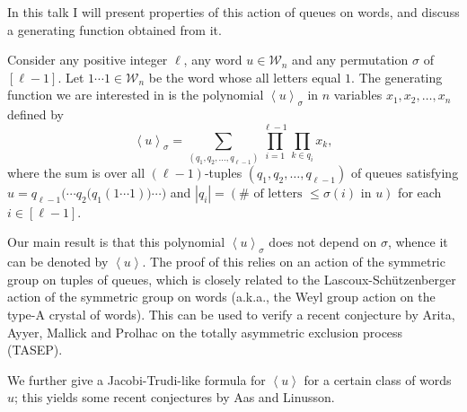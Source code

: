 \documentclass[reqno]{amsart}
\newcommand{\0}{\phantom{c}}
\newcommand{\swt}[1]{\left\langle #1 \right\rangle} %
\newcommand{\mcW}{\mathcal{W}}
\let\sumnonlimits\sum
\let\prodnonlimits\prod
\renewcommand{\sum}{\sumnonlimits\limits}
\renewcommand{\prod}{\prodnonlimits\limits}
\newcommand{\abs}[1]{\left| #1 \right|}
\newcommand{\tup}[1]{\left( #1 \right)}
\newcommand{\ive}[1]{\left[ #1 \right]}
\newcommand{\defn}[1]{{\color{darkred}\emph{#1}}} %
\theoremstyle{plain}
\theoremstyle{definition}
\numberwithin{equation}{section}
\begin{document}
In this talk I will present properties of this action of queues on words, and discuss a generating function obtained from it.

Consider any positive integer $\ell$, any word $u \in \mcW_n$ and any permutation $\sigma$ of $\ive{\ell-1}$. Let $1 \cdots 1 \in \mcW_n$ be the word whose all letters equal $1$. The generating function we are interested in is the polynomial \defn{$\swt{u}_\sigma$} in $n$ variables $x_1, x_2, \ldots, x_n$ defined by
\[
\swt{u}_\sigma = \sum_{\tup{q_1, q_2, \ldots, q_{\ell-1}}} \prod_{i=1}^{\ell-1} \prod_{k \in q_i} x_k ,
\]
where the sum is over all $\tup{\ell-1}$-tuples $\tup{q_1, q_2, \ldots, q_{\ell-1}}$ of queues satisfying $u =  q_{\ell-1}\bigl( \cdots q_2\bigl( q_1(1 \cdots 1) \bigr) \cdots \bigr)$ and $\abs{q_i} = \tup{\# \text{ of letters } \leq \sigma\tup{i} \text{ in }u }$ for each $i\in\ive{\ell-1}$.

Our main result is that this polynomial $\swt{u}_\sigma$ does not depend on $\sigma$, whence it can be denoted by \defn{$\swt{u}$}. The proof of this relies on an action of the symmetric group on tuples of queues, which is closely related to the Lascoux-Sch\"utzenberger action of the symmetric group on words (a.k.a., the Weyl group action on the type-A crystal of words). This can be used to verify a recent conjecture by Arita, Ayyer, Mallick and Prolhac on the totally asymmetric exclusion process (TASEP).

We further give a Jacobi-Trudi-like formula for $\swt{u}$ for a certain class of words $u$; this yields some recent conjectures by Aas and Linusson.

% 
\end{document}
